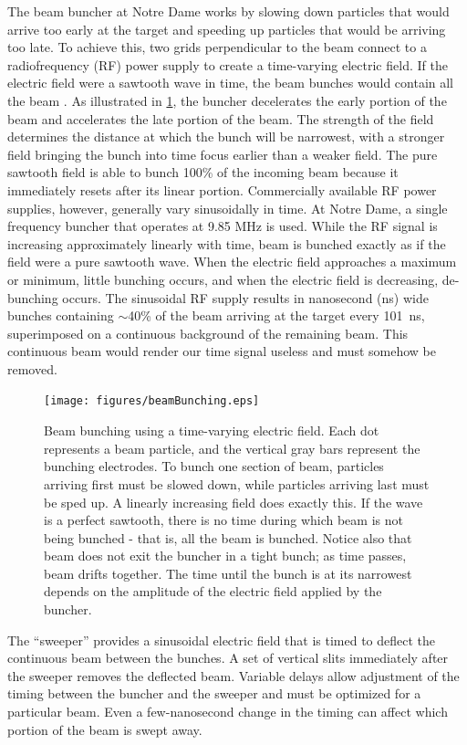 The beam buncher at Notre Dame works by slowing down particles that would arrive too early at the target and speeding up particles that would be arriving too late.  To achieve this, two grids perpendicular to the beam connect to a radiofrequency (RF) power supply to create a time-varying electric field.  If the electric field were a sawtooth wave in time, the beam bunches would contain all the beam \cite{LynchBunching}.  As illustrated in \fig \ref{fig:bunching}, the buncher decelerates the early portion of the beam and accelerates the late portion of the beam.  The strength of the field determines the distance at which the bunch will be narrowest, with a stronger field bringing the bunch into time focus earlier than a weaker field.  The pure sawtooth field is able to bunch 100\% of the incoming beam because it immediately resets after its linear portion.  Commercially available RF power supplies, however, generally vary sinusoidally in time.  At Notre Dame, a single frequency buncher that operates at 9.85 MHz is used.  While the RF signal is increasing approximately linearly with time, beam is bunched exactly as if the field were a pure sawtooth wave.  When the electric field approaches a maximum or minimum, little bunching occurs, and when the electric field is decreasing, de-bunching occurs.  The sinusoidal RF supply results in nanosecond (ns) wide bunches containing $\sim$40\% of the beam arriving at the target every 101~ns, superimposed on a continuous background of the remaining beam.  This continuous beam would render our time signal useless and must somehow be removed.

\begin{figure}[htp]
\centering
\texttt{[image: figures/beamBunching.eps]}
\label{fig:bunching}
\caption{Beam bunching using a time-varying electric field.  Each dot represents a beam particle, and the vertical gray bars represent the bunching electrodes.  To bunch one section of beam, particles arriving first must be slowed down, while particles arriving last must be sped up.  A linearly increasing field does exactly this.  If the wave is a perfect sawtooth, there is no time during which beam is not being bunched - that is, all the beam is bunched.  Notice also that beam does not exit the buncher in a tight bunch; as time passes, beam drifts together.  The time until the bunch is at its narrowest depends on the amplitude of the electric field applied by the buncher.}
\end{figure}

The ``sweeper'' provides a sinusoidal electric field that is timed to deflect the continuous beam between the bunches.  A set of vertical slits immediately after the sweeper removes the deflected beam.  Variable delays allow adjustment of the timing between the buncher and the sweeper and must be optimized for a particular beam.  Even a few-nanosecond change in the timing can affect which portion of the beam is swept away. 

